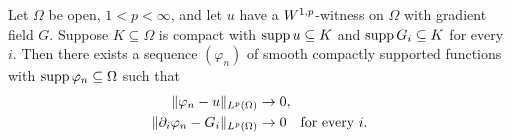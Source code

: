 \begin{theorem}
\label{thm:smooth_approx_local}
\leanok
{}
Let $\Omega$ be open, $1 < p < \infty$, and let $u$ have a $W^{1,p}$-witness
on $\Omega$ with gradient field $G$. Suppose $K \subseteq \Omega$ is compact
with $\operatorname{supp} u \subseteq K$ and $\operatorname{supp} G_i \subseteq K$ for every $i$. Then
there exists a sequence $(\varphi_n)$ of smooth compactly supported functions
with $\operatorname{supp}\varphi_n \subseteq \Omega$ such that
\begin{align*}
  \|\varphi_n - u\|_{L^{p}(\Omega)} &\to 0, \\
  \|\partial_i\varphi_n - G_i\|_{L^{p}(\Omega)} &\to 0 \quad\text{for every } i.
\end{align*}
\end{theorem}

